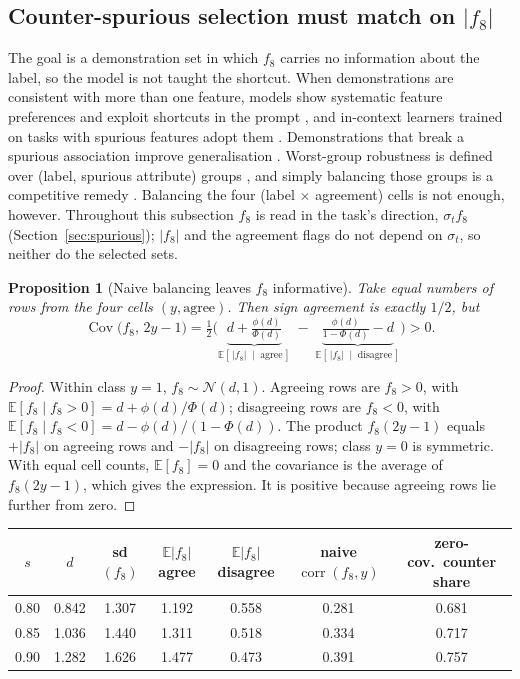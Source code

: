 \documentclass[11pt,a4paper]{article}
\newcommand{\1}{\mathbf{1}}
\newcommand{\E}{\mathbb{E}}
\DeclareMathOperator{\corr}{corr}
\DeclareMathOperator{\Cov}{Cov}
\theoremstyle{plain}
\newtheorem{proposition}[theorem]{Proposition}
\theoremstyle{definition}
\theoremstyle{remark}
\begin{document}
\subsection{Counter-spurious selection must match on \texorpdfstring{$|f_8|$}{|f8|}}
\label{sec:counter-spurious}

The goal is a demonstration set in which $f_8$ carries no information about
the label, so the model is not taught the shortcut. When demonstrations are
consistent with more than one feature, models show systematic feature
preferences \citep{si2023measuring} and exploit shortcuts in the prompt
\citep{tang2023large}, and in-context learners trained on tasks with
spurious features adopt them \citep{harutyunyan2026incontext,chen2026incontext}.
Demonstrations that break a spurious association improve generalisation
\citep{fan2024comparable}. Worst-group robustness is defined over
(label, spurious attribute) groups \citep{sagawa2020distributionally}, and
simply balancing those groups is a competitive remedy
\citep{idrissi2022simple}. Balancing the four
(label $\times$ agreement) cells is not enough, however.
Throughout this subsection $f_8$ is read in the task's direction,
$\sigma_t f_8$ (Section~\ref{sec:spurious}); $|f_8|$ and the agreement flags
do not depend on $\sigma_t$, so neither do the selected sets.

\begin{proposition}[Naive balancing leaves $f_8$ informative]
\label{prop:naive-balance}
Take equal numbers of rows from the four cells $(y, \text{agree})$. Then
sign agreement is exactly $1/2$, but
\[
  \Cov\!\big(f_8,\, 2y-1\big) = \tfrac12\Big(
  \underbrace{d + \tfrac{\phi(d)}{\Phi(d)}}_{\E[\,|f_8| \;\mid\; \mathrm{agree}\,]}
  \;-\;
  \underbrace{\tfrac{\phi(d)}{1 - \Phi(d)} - d}_{\E[\,|f_8| \;\mid\; \mathrm{disagree}\,]}
  \Big) > 0 .
\]
\end{proposition}
\begin{proof}
Within class $y=1$, $f_8 \sim \mathcal{N}(d,1)$. Agreeing rows are
$f_8 > 0$, with $\E[f_8 \mid f_8 > 0] = d + \phi(d)/\Phi(d)$; disagreeing
rows are $f_8 < 0$, with $\E[f_8 \mid f_8 < 0] = d - \phi(d)/(1-\Phi(d))$.
The product $f_8(2y-1)$ equals $+|f_8|$ on agreeing rows and $-|f_8|$ on
disagreeing rows; class $y=0$ is symmetric. With equal cell counts,
$\E[f_8] = 0$ and the covariance is the average of $f_8(2y-1)$, which gives
the expression. It is positive because agreeing rows lie further from zero.
\end{proof}

\begin{center}
{\small\setlength{\tabcolsep}{5pt}
\begin{tabular}{ccccccc}
\toprule
$s$ & $d$ & sd$(f_8)$ & $\E|f_8|$ agree & $\E|f_8|$ disagree & naive $\corr(f_8, y)$ & zero-cov.\ counter share \\
\midrule
0.80 & 0.842 & 1.307 & 1.192 & 0.558 & 0.281 & 0.681 \\
0.85 & 1.036 & 1.440 & 1.311 & 0.518 & 0.334 & 0.717 \\
0.90 & 1.282 & 1.626 & 1.477 & 0.473 & 0.391 & 0.757 \\
\bottomrule
\end{tabular}}
\end{center}
\end{document}
